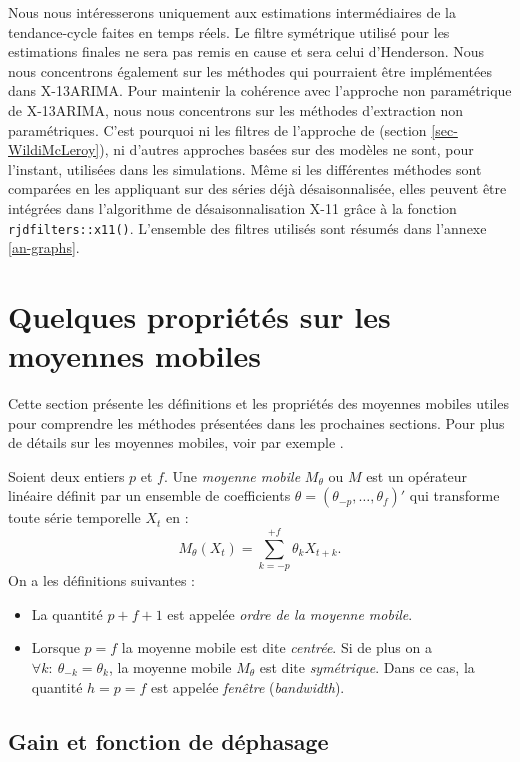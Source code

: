 \documentclass[
  12pt,
  a4paper,french]{article}
\newcommand\1{\mathds{1}}
\begin{document}
Nous nous intéresserons uniquement aux estimations intermédiaires de la tendance-cycle faites en temps réels.
Le filtre symétrique utilisé pour les estimations finales ne sera pas remis en cause et sera celui d'Henderson.
Nous nous concentrons également sur les méthodes qui pourraient être implémentées dans X-13ARIMA.
Pour maintenir la cohérence avec l'approche non paramétrique de X-13ARIMA, nous nous concentrons sur les méthodes d'extraction non paramétriques.
C'est pourquoi ni les filtres de l'approche de \textcite{trilemmaWMR2019} (section \ref{sec-WildiMcLeroy}), ni d'autres approches basées sur des modèles ne sont, pour l'instant, utilisées dans les simulations.
Même si les différentes méthodes sont comparées en les appliquant sur des séries déjà désaisonnalisée, elles peuvent être intégrées dans l'algorithme de désaisonnalisation X-11 grâce à la fonction \texttt{rjdfilters::x11()}.
L'ensemble des filtres utilisés sont résumés dans l'annexe \ref{an-graphs}.

\hypertarget{sec-propMM}{%
\section{Quelques propriétés sur les moyennes mobiles}\label{sec-propMM}}

Cette section présente les définitions et les propriétés des moyennes mobiles utiles pour comprendre les méthodes présentées dans les prochaines sections. Pour plus de détails sur les moyennes mobiles, voir par exemple \textcite{ch12HBSA}.

Soient deux entiers \(p\) et \(f\).
Une \emph{moyenne mobile} \(M_\theta\) ou \(M\) est un opérateur linéaire définit par un ensemble de coefficients \(\theta=(\theta_{-p},\dots,\theta_{f})'\) qui transforme toute série temporelle \(X_t\) en :
\[
M_\theta(X_t)=\sum_{k=-p}^{+f}\theta_kX_{t+k}.
\]
On a les définitions suivantes :

\begin{itemize}
\item
  La quantité \(p+f+1\) est appelée \emph{ordre de la moyenne mobile}.
\item
  Lorsque \(p=f\) la moyenne mobile est dite \emph{centrée}.
  Si de plus on a \(\forall k:\:\theta_{-k} = \theta_k\), la moyenne mobile \(M_\theta\) est dite \emph{symétrique}.
  Dans ce cas, la quantité \(h=p=f\) est appelée \emph{fenêtre} (\emph{bandwidth}).
\end{itemize}

\hypertarget{gain-et-fonction-de-duxe9phasage}{%
\subsection{Gain et fonction de déphasage}\label{gain-et-fonction-de-duxe9phasage}}
\end{document}
